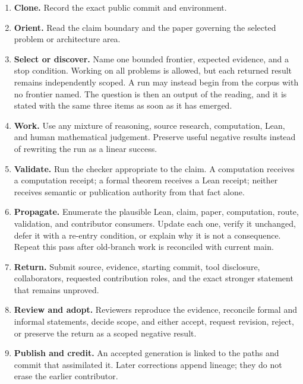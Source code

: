 \documentclass[10pt]{article}
\begin{document}
\begin{enumerate}
\item \textbf{Clone.}  Record the exact public commit and environment.
\item \textbf{Orient.}  Read the claim boundary and the paper governing the
      selected problem or architecture area.
\item \textbf{Select or discover.}  Name one bounded frontier, expected
      evidence, and a stop condition.  Working on all problems is allowed, but
      each returned result remains independently scoped.  A run may instead
      begin from the corpus with no frontier named.  The question is then an
      output of the reading, and it is stated with the same three items as
      soon as it has emerged.
\item \textbf{Work.}  Use any mixture of reasoning, source research,
      computation, Lean, and human mathematical judgement.  Preserve useful
      negative results instead of rewriting the run as a linear success.
\item \textbf{Validate.}  Run the checker appropriate to the claim.  A
      computation receives a computation receipt; a formal theorem receives a
      Lean receipt; neither receives semantic or publication authority from
      that fact alone.
\item \textbf{Propagate.}  Enumerate the plausible Lean, claim, paper,
      computation, route, validation, and contributor consumers.  Update each
      one, verify it unchanged, defer it with a re-entry condition, or explain
      why it is not a consequence.  Repeat this pass after old-branch work is
      reconciled with current main.
\item \textbf{Return.}  Submit source, evidence, starting commit, tool
      disclosure, collaborators, requested contribution roles, and the exact
      stronger statement that remains unproved.
\item \textbf{Review and adopt.}  Reviewers reproduce the evidence, reconcile
      formal and informal statements, decide scope, and either accept, request
      revision, reject, or preserve the return as a scoped negative result.
\item \textbf{Publish and credit.}  An accepted generation is linked to the
      paths and commit that assimilated it.  Later corrections append lineage;
      they do not erase the earlier contributor.
\end{enumerate}
\end{document}

